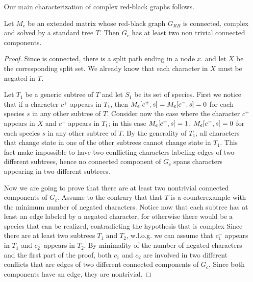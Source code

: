 Our main characterization of complex red-black graphs follows.

\begin{lemma}
  \label{lem:twoComp}
Let $M_e$ be an extended matrix whose red-black graph  $G_{RB}$
is connected, complex and solved by a standard tree $T$.
Then $G_{c}$ has  at least two non trivial
connected components.

\end{lemma}


\begin{proof} %
Since \grb is connected, there is a split path ending in a node $x$. and let
$X$ be the corresponding split set.
We already know that each character in
$X$ must be negated in $T$.

Let $T_{1}$ be a generic subtree of $T$ and let $S_{1}$ be its set of species.
First we notice that if a character $c^{+}$ appears in $T_{1}$, then
$M_{e}[c^{+},s]=M_{e}[c^{-},s]=0$ for each species $s$ in any other subtree of $T$.
Consider now the case where the character $c^{+}$ appears in $X$ and $c^{-}$
appears in $T_{1}$; in this case $M_{e}[c^{+},s]=1$, $M_{e}[c^{-},s]=0$ for each
species $s$ in any other subtree of $T$.
By the generality of $T_{1}$, all characters that change state in one of the
other subtrees cannot change state in $T_{1}$.
This fact make impossible to have two conflicting characters labeling edges of
two different subtrees, hence no connected component of $G_{c}$ spans characters
appearing in two different subtrees.

Now we are going to prove that there are at least two nontrivial connected
components of $G_{c}$.
Assume to the contrary that that $T$ is a counterexample with the minimum number
of negated characters.
Notice now that each subtree has at least an edge labeled by a negated
character, for otherwise there would be a species that can be realized,
contradicting the hypothesis that \grb is complex
Since there are at least two subtrees $T_{1}$ and $T_{2}$, w.l.o.g. we can
assume that $c_{1}^{-}$ appears in $T_{1}$ and $c_{2}^{-}$ appears in $T_{2}$.
By minimality of the number of negated characters and the first part of the
proof, both $c_{1}$ and $c_{2}$ are involved in two different conflicts that are
edges of two different connected components of $G_{c}$.
Since both components have an edge, they are nontrivial.
\end{proof}





